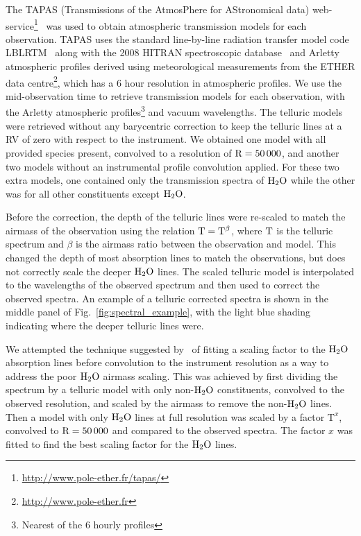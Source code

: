 \documentclass[fleqn,usenatbib]{mnras}
\newcommand*\bl{\color{blue}}
\begin{document}
    The TAPAS (Transmissions of the AtmosPhere for AStronomical data) web-service\footnote{\url{http://www.pole-ether.fr/tapas/}}~\citep{bertaux_tapas_2014} was used to obtain atmospheric transmission models for each observation. TAPAS uses the standard line-by-line radiation transfer model code LBLRTM~\citep{clough_linebyline_1995} along with the 2008 HITRAN spectroscopic database~\citep{rothman_hitran_2009} and Arletty atmospheric profiles derived using meteorological measurements from the ETHER data centre\footnote{\url{http://www.pole-ether.fr}}, which has a 6 hour resolution in atmospheric profiles.
    We use the mid-observation time to retrieve transmission models for each observation, with the Arletty atmospheric profiles\footnote{Nearest of the 6 hourly profiles} and vacuum wavelengths. The telluric models were retrieved without any barycentric correction to keep the telluric lines at a RV of zero with respect to the instrument. We obtained one model with all provided species present, convolved to a resolution of \(\rm R=50\,000\), and another two models without an instrumental profile convolution applied. For these two extra models, one contained only the transmission spectra of \(\rm H_{2}O\) while the other was for all other constituents except \(\rm H_{2}O\).
    
    Before the correction, the depth of the telluric lines were re-scaled to match the airmass of the observation using the relation \(\rm T = T^{\beta}\), where \(\rm T\) is the telluric spectrum and \(\beta\) is the airmass ratio between the observation and model. This changed the depth of most absorption lines to match the observations, but does not correctly scale the deeper \(\rm H_{2}O\) lines. The scaled telluric model is interpolated to the wavelengths of the observed spectrum and then used to correct the observed spectra. An example of a telluric corrected spectra is shown in the middle panel of Fig.~\ref{fig:spectral_example}, with the light blue shading indicating where the deeper telluric lines were.
    
    {\bl We attempted the technique suggested by~\citet{bertaux_tapas_2014} of fitting a scaling factor to the \(\rm {H}_{2}O\) absorption lines before convolution to the instrument resolution as a way to address the poor \(\rm H_{2}O\) airmass scaling.} This was achieved by first dividing the spectrum by a telluric model with only non-\(\rm H_{2}O\) constituents, convolved to the observed resolution, and scaled by the airmass to remove the non-\(\rm H_{2}O\) lines. Then a model with only \(\rm H_{2}O\) lines at full resolution was scaled by a factor \(\textrm{T}^{x}\), convolved to \(\rm R=50\,000\) and compared to the observed spectra. The factor \(x\) was fitted to find the best scaling factor for the \(\rm H_{2}O\) lines.
    
\end{document}
